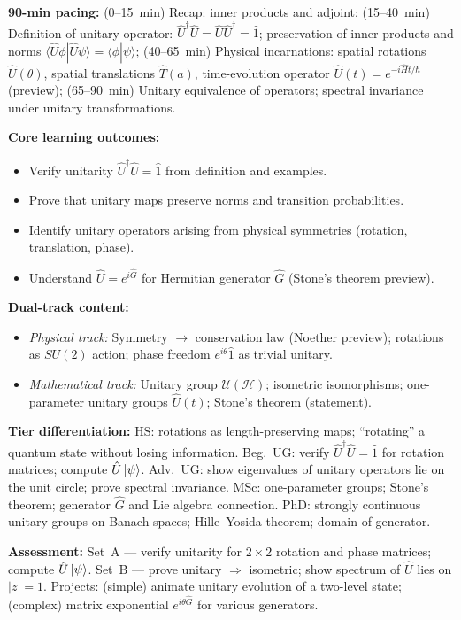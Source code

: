 \documentclass[11pt,a4paper]{article}
\begin{document}
\begin{tcolorbox}[modulebox, title={Module~I.1 / L02: Unitary Operators and Symmetry Transformations}]
\textbf{90-min pacing:} (0--15~min) Recap: inner products and adjoint;
(15--40~min) Definition of unitary operator: $\hat{U}^\dagger\hat{U} = \hat{U}\hat{U}^\dagger = \hat{1}$;
preservation of inner products and norms $\langle\hat{U}\phi|\hat{U}\psi\rangle = \langle\phi|\psi\rangle$;
(40--65~min) Physical incarnations: spatial rotations $\hat{U}(\theta)$, spatial translations $\hat{T}(a)$,
time-evolution operator $\hat{U}(t) = e^{-i\hat{H}t/\hbar}$ (preview);
(65--90~min) Unitary equivalence of operators; spectral invariance under unitary transformations.

\medskip\textbf{Core learning outcomes:}
\begin{itemize}[leftmargin=1.4em,topsep=2pt,itemsep=1pt]
  \item Verify unitarity $\hat{U}^\dagger\hat{U}=\hat{1}$ from definition and examples.
  \item Prove that unitary maps preserve norms and transition probabilities.
  \item Identify unitary operators arising from physical symmetries (rotation, translation, phase).
  \item Understand $\hat{U} = e^{i\hat{G}}$ for Hermitian generator $\hat{G}$ (Stone's theorem preview).
\end{itemize}

\medskip\textbf{Dual-track content:}
\begin{itemize}[leftmargin=1.4em,topsep=2pt,itemsep=1pt]
  \item \textit{Physical track:} Symmetry $\to$ conservation law (Noether preview); rotations as $SU(2)$
    action; phase freedom $e^{i\theta}\hat{1}$ as trivial unitary.
  \item \textit{Mathematical track:} Unitary group $\mathcal{U}(\mathcal{H})$; isometric isomorphisms;
    one-parameter unitary groups $\hat{U}(t)$; Stone's theorem (statement).
\end{itemize}

\medskip\textbf{Tier differentiation:}
HS: rotations as length-preserving maps; ``rotating'' a quantum state without losing information.
Beg.\ UG: verify $\hat{U}^\dagger\hat{U}=\hat{1}$ for rotation matrices; compute $\hat{U}\ket{\psi}$.
Adv.\ UG: show eigenvalues of unitary operators lie on the unit circle; prove spectral invariance.
MSc: one-parameter groups; Stone's theorem; generator $\hat{G}$ and Lie algebra connection.
PhD: strongly continuous unitary groups on Banach spaces; Hille--Yosida theorem; domain of generator.

\medskip\textbf{Assessment:}
Set~A --- verify unitarity for $2\times 2$ rotation and phase matrices; compute $\hat{U}\ket{\psi}$.
Set~B --- prove unitary $\Rightarrow$ isometric; show spectrum of $\hat{U}$ lies on $|z|=1$.
Projects: (simple) animate unitary evolution of a two-level state; (complex) matrix exponential $e^{i\theta\hat{G}}$ for various generators.
\end{tcolorbox}
\end{document}
